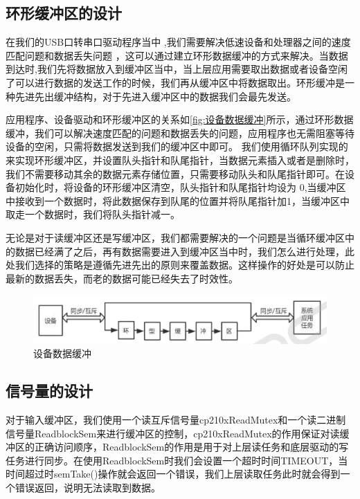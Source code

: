 	

\subsection{环形缓冲区的设计}

	在我们的USB口转串口驱动程序当中 ,我们需要解决低速设备和处理器之间的速度匹配问题和数据丢失问题 ，这可以通过建立环形数据缓冲的方式来解决。当数据到达时,我们先将数据放入到缓冲区当中，当上层应用需要取出数据或者设备空闲了可以进行数据的发送工作的时候，我们再从缓冲区中将数据取出。环形缓冲是一种先进先出缓冲结构，对于先进入缓冲区中的数据我们会最先发送。
		
  应用程序、设备驱动和环形缓冲区的关系如\autoref{fig:设备数据缓冲}所示，通过环形数据缓冲，我们可以解决速度匹配的问题和数据丢失的问题，应用程序也无需阻塞等待设备的空闲，只需将数据发送到我们的缓冲区中即可。
	我们使用循环队列实现的来实现环形缓冲区，并设置队头指针和队尾指针，当数据元素插入或者是删除时，我们不需要移动其余的数据元素存储位置，只需要移动队头和队尾指针即可。在设备初始化时，将设备的环形缓冲区清空，队头指针和队尾指针均设为 0,当缓冲区中接收到一个数据时，将此数据保存到队尾的位置并将队尾指针加1，当缓冲区中取走一个数据时，我们将队头指针减一。

	无论是对于读缓冲区还是写缓冲区，我们都需要解决的一个问题是当循环缓冲区中的数据已经满了之后，再有数据需要进入到缓冲区当中时，我们怎么进行处理，此处我们选择的策略是遵循先进先出的原则来覆盖数据。这样操作的好处是可以防止最新的数据丢失，而老的数据可能已经失去了时效性。

\begin{figure}[!h]
\centering
\includegraphics[width=.9\textwidth]{./graphics/Dev-Data-Buf.pdf}
\caption{设备数据缓冲}\label{fig:设备数据缓冲}
\end{figure}

\subsection{信号量的设计}
	对于输入缓冲区，我们使用一个读互斥信号量cp210xReadMutex和一个读二进制信号量ReadblockSem来进行缓冲区的控制，cp210xReadMutex的作用保证对读缓冲区的正确访问顺序，ReadblockSem的作用是用于对上层读任务和底层驱动的写任务进行同步。在使用ReadblockSem时我们会设置一个超时时间TIMEOUT，当时间超过时semTake()操作就会返回一个错误，我们上层读取任务此时就会得到一个错误返回，说明无法读取到数据。

